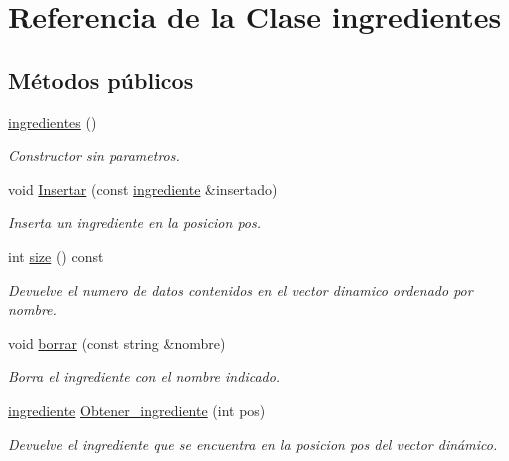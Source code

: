 \hypertarget{classingredientes}{}\section{Referencia de la Clase ingredientes}
\label{classingredientes}
\subsection*{Métodos públicos}
\begin{DoxyCompactItemize}
\item 
\mbox{\label{classingredientes_adb3e000aa798184c7253c401f165c1a5}} 
\hyperlink{classingredientes_adb3e000aa798184c7253c401f165c1a5}{ingredientes} ()
\begin{DoxyCompactList}\small\item\em Constructor sin parametros. \end{DoxyCompactList}\item 
void \hyperlink{classingredientes_a2380f0b945d44f0c1c7e26a4cb5e1247}{Insertar} (const \hyperlink{classingrediente}{ingrediente} \&insertado)
\begin{DoxyCompactList}\small\item\em Inserta un ingrediente en la posicion pos. \end{DoxyCompactList}\item 
\mbox{\label{classingredientes_aaf628d0360800484ae277fbb7aa2f81d}} 
int \hyperlink{classingredientes_aaf628d0360800484ae277fbb7aa2f81d}{size} () const
\begin{DoxyCompactList}\small\item\em Devuelve el numero de datos contenidos en el vector dinamico ordenado por nombre. \end{DoxyCompactList}\item 
void \hyperlink{classingredientes_a8d8d637d74d3cfb1382cf4f0646a6fb8}{borrar} (const string \&nombre)
\begin{DoxyCompactList}\small\item\em Borra el ingrediente con el nombre indicado. \end{DoxyCompactList}\item 
\hyperlink{classingrediente}{ingrediente} \hyperlink{classingredientes_a0b1562faa104954dd65d92e7fa17cdf8}{Obtener\+\_\+ingrediente} (int pos)
\begin{DoxyCompactList}\small\item\em Devuelve el ingrediente que se encuentra en la posicion pos del vector dinámico. \end{DoxyCompactList}\item 

\end{DoxyCompactItemize}
